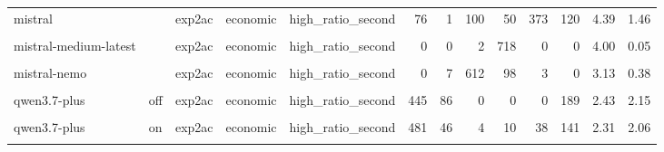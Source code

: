 \documentclass[
]{article}
\begin{document}
\begin{table}[!h]
{\begin{tabular}[t]{lllllrrrrrrrr}
mistral &  & exp2ac & economic & high\_ratio\_second & 76 & 1 & 100 & 50 & 373 & 120 & 4.39 & 1.46\\
\cellcolor{gray!10}{mistral-medium-latest} & \cellcolor{gray!10}{} & \cellcolor{gray!10}{exp2ac} & \cellcolor{gray!10}{economic} & \cellcolor{gray!10}{high\_ratio\_first} & \cellcolor{gray!10}{0} & \cellcolor{gray!10}{275} & \cellcolor{gray!10}{445} & \cellcolor{gray!10}{0} & \cellcolor{gray!10}{0} & \cellcolor{gray!10}{0} & \cellcolor{gray!10}{2.62} & \cellcolor{gray!10}{0.49}\\
mistral-medium-latest &  & exp2ac & economic & high\_ratio\_second & 0 & 0 & 2 & 718 & 0 & 0 & 4.00 & 0.05\\
\addlinespace
\cellcolor{gray!10}{mistral-nemo} & \cellcolor{gray!10}{} & \cellcolor{gray!10}{exp2ac} & \cellcolor{gray!10}{economic} & \cellcolor{gray!10}{high\_ratio\_first} & \cellcolor{gray!10}{0} & \cellcolor{gray!10}{9} & \cellcolor{gray!10}{187} & \cellcolor{gray!10}{497} & \cellcolor{gray!10}{27} & \cellcolor{gray!10}{0} & \cellcolor{gray!10}{3.75} & \cellcolor{gray!10}{0.54}\\
mistral-nemo &  & exp2ac & economic & high\_ratio\_second & 0 & 7 & 612 & 98 & 3 & 0 & 3.13 & 0.38\\
\cellcolor{gray!10}{qwen3.7-plus} & \cellcolor{gray!10}{off} & \cellcolor{gray!10}{exp2ac} & \cellcolor{gray!10}{economic} & \cellcolor{gray!10}{high\_ratio\_first} & \cellcolor{gray!10}{390} & \cellcolor{gray!10}{0} & \cellcolor{gray!10}{0} & \cellcolor{gray!10}{0} & \cellcolor{gray!10}{118} & \cellcolor{gray!10}{212} & \cellcolor{gray!10}{3.13} & \cellcolor{gray!10}{2.34}\\
qwen3.7-plus & off & exp2ac & economic & high\_ratio\_second & 445 & 86 & 0 & 0 & 0 & 189 & 2.43 & 2.15\\
\cellcolor{gray!10}{qwen3.7-plus} & \cellcolor{gray!10}{on} & \cellcolor{gray!10}{exp2ac} & \cellcolor{gray!10}{economic} & \cellcolor{gray!10}{high\_ratio\_first} & \cellcolor{gray!10}{334} & \cellcolor{gray!10}{72} & \cellcolor{gray!10}{6} & \cellcolor{gray!10}{1} & \cellcolor{gray!10}{116} & \cellcolor{gray!10}{191} & \cellcolor{gray!10}{3.09} & \cellcolor{gray!10}{2.23}\\
\addlinespace
qwen3.7-plus & on & exp2ac & economic & high\_ratio\_second & 481 & 46 & 4 & 10 & 38 & 141 & 2.31 & 2.06\\
\cellcolor{gray!10}{claude-sonnet-5-5} & \cellcolor{gray!10}{high} & \cellcolor{gray!10}{exp2ac} & \cellcolor{gray!10}{moral} & \cellcolor{gray!10}{high\_ratio\_first} & \cellcolor{gray!10}{22} & \cellcolor{gray!10}{118} & \cellcolor{gray!10}{46} & \cellcolor{gray!10}{42} & \cellcolor{gray!10}{285} & \cellcolor{gray!10}{98} & \cellcolor{gray!10}{4.22} & \cellcolor{gray!10}{1.50}\\

\end{tabular}}
\end{table}
\end{document}
